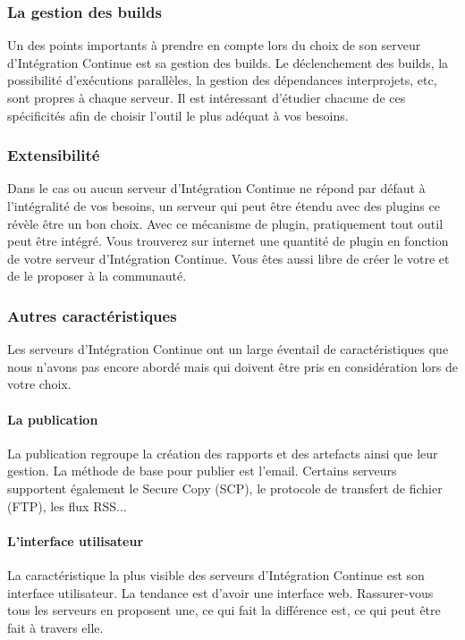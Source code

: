       \subsubsection{La gestion des builds}
      Un des points importants à prendre en compte lors du choix de son serveur d'Intégration Continue est sa gestion des builds. Le déclenchement des builds, la possibilité d'exécutions parallèles, la gestion des dépendances interprojets, etc, sont propres à chaque serveur. Il est intéressant d'étudier chacune de ces spécificités afin de choisir l'outil le plus adéquat à vos besoins.

      \subsubsection{Extensibilité}
      Dans le cas ou aucun serveur d'Intégration Continue ne répond par défaut à l'intégralité de vos besoins, un serveur qui peut être étendu avec des plugins ce révèle être un bon choix. Avec ce mécanisme de plugin, pratiquement tout outil peut être intégré. Vous trouverez sur internet une quantité de plugin en fonction de votre serveur d'Intégration Continue. Vous êtes aussi libre de créer le votre et de le proposer à la communauté.

      \subsubsection{Autres caractéristiques}
      Les serveurs d'Intégration Continue ont un large éventail de caractéristiques que nous n'avons pas encore abordé mais qui doivent être pris en considération lors de votre choix.
      \paragraph{La publication} La publication regroupe la création des rapports et des artefacts ainsi que leur gestion. La méthode de base pour publier est l'email. Certains serveurs supportent également le Secure Copy (SCP), le protocole de transfert de fichier (FTP), les flux RSS...
      \paragraph{L'interface utilisateur} La caractéristique la plus visible des serveurs d'Intégration Continue est son interface utilisateur. La tendance est d'avoir une interface web. Rassurer-vous tous les serveurs en proposent une, ce qui fait la différence est, ce qui peut être fait à travers elle.
